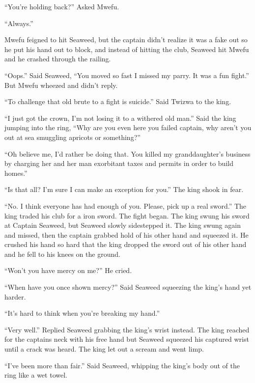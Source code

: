 ``You're holding back?'' Asked Mwefu.

``Always.''

Mwefu feigned to hit Seaweed, but the captain didn't realize it was a fake out so he put his hand out to block, and instead of hitting the club, Seaweed hit Mwefu and he crashed through the railing.

``Oops.'' Said Seaweed, ``You moved so fast I missed my parry. It was a fun fight.'' But Mwefu wheezed and didn't reply.

``To challenge that old brute to a fight is suicide.'' Said Twizwa to the king.

``I just got the crown, I'm not losing it to a withered old man.'' Said the king jumping into the ring, ``Why are you even here you failed captain, why aren't you out at sea smuggling apricots or something?''

``Oh believe me, I'd rather be doing that. You killed my granddaughter's business by charging her and her man exorbitant taxes and permits in order to build homes.''

``Is that all? I'm sure I can make an exception for you.'' The king shook in fear.

``No. I think everyone has had enough of you. Please, pick up a real sword.'' The king traded his club for a iron sword. The fight began. The king swung his sword at Captain Seaweed, but Seaweed slowly sidestepped it. The king swung again and missed, then the captain grabbed hold of his other hand and squeezed it. He crushed his hand so hard that the king dropped the sword out of his other hand and he fell to his knees on the ground.

``Won't you have mercy on me?'' He cried.

``When have you once shown mercy?'' Said Seaweed squeezing the king's hand yet harder.

``It's hard to think when you're breaking my hand.''


``Very well.'' Replied Seaweed grabbing the king's wrist instead. The king reached for the captains neck with his free hand but Seaweed squeezed his captured wrist until a crack was heard. The king let out a scream and went limp.

``I've been more than fair.'' Said Seaweed, whipping the king's body out of the ring like a wet towel.
